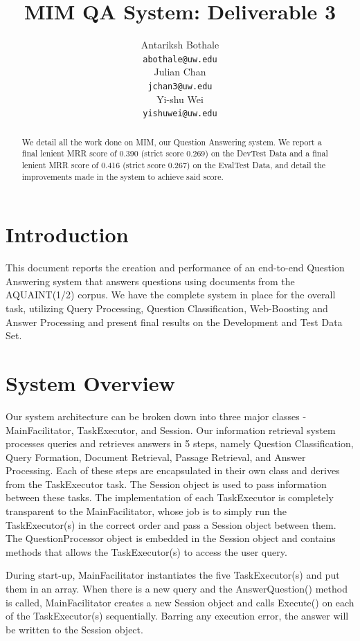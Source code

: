\documentclass[11pt]{article}
\title{MIM QA System: Deliverable 3}
\author{Antariksh Bothale \\
  {\tt abothale@uw.edu} \\\And
  Julian Chan\\
  {\tt jchan3@uw.edu} \\\And
  Yi-shu Wei\\
  {\tt yishuwei@uw.edu}}
\date{}
\begin{document}
\maketitle
\begin{abstract}
We detail all the work done on MIM, our Question Answering system. We report a final lenient MRR score of 0.390 (strict score 0.269) on the DevTest Data and a final lenient MRR score of 0.416 (strict score 0.267) on the EvalTest Data, and detail the improvements made in the system to achieve said score.
\end{abstract}

\section{Introduction}
This document reports the creation and performance of an end-to-end Question Answering system that answers questions using documents from the AQUAINT(1/2) corpus. We have the complete system in place for the overall task, utilizing Query Processing, Question Classification, Web-Boosting and Answer Processing and present final results on the Development and Test Data Set. 

\section{System Overview}

Our system architecture can be broken down into three major classes - MainFacilitator, TaskExecutor, and Session. Our information retrieval system processes queries and retrieves answers in 5 steps, namely Question Classification, Query Formation, Document Retrieval, Passage Retrieval, and Answer Processing. Each of these steps are encapsulated in their own class and derives from the TaskExecutor task. The Session object is used to pass information between these tasks. The implementation of each TaskExecutor is completely transparent to the MainFacilitator, whose job is to simply run the TaskExecutor(s) in the correct order and pass a Session object between them. The QuestionProcessor object is embedded in the Session object and contains methods that allows the TaskExecutor(s) to access the user query.

During start-up, MainFacilitator instantiates the five TaskExecutor(s) and put them in an array. When there is a new query and the AnswerQuestion() method is called, MainFacilitator creates a new Session object and calls Execute() on each of the TaskExecutor(s) sequentially. Barring any execution error, the answer will be written to the Session object.
\end{document}
